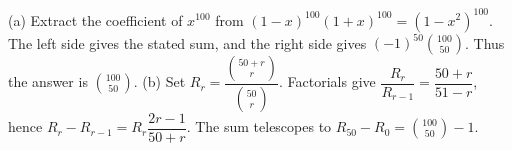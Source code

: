 (a) Extract the coefficient of $x^{100}$ from $(1-x)^{100}(1+x)^{100}=(1-x^2)^{100}$. The left side gives the stated sum, and the right side gives $(-1)^{50}\binom{100}{50}$. Thus the answer is $\boxed{\binom{100}{50}}$. (b) Set $R_r=\dfrac{\binom{50+r}r}{\binom{50}r}$. Factorials give $\dfrac{R_r}{R_{r-1}}=\dfrac{50+r}{51-r}$, hence $R_r-R_{r-1}=R_r\dfrac{2r-1}{50+r}$. The sum telescopes to $R_{50}-R_0=\boxed{\binom{100}{50}-1}$.
